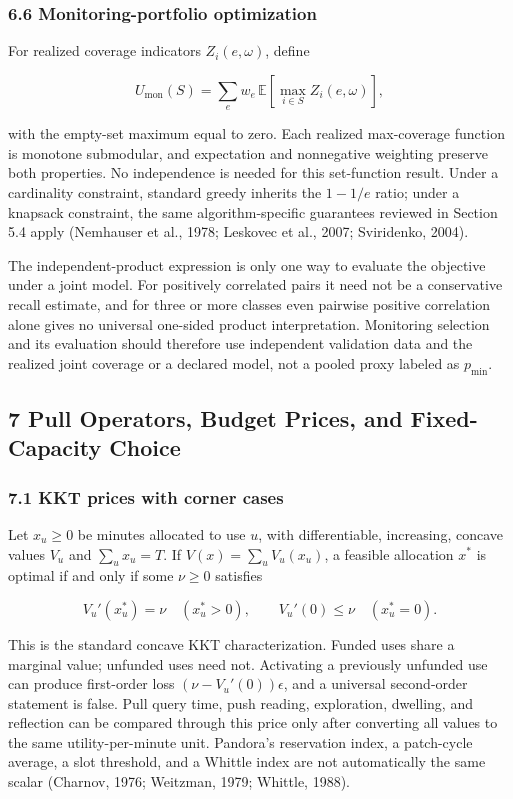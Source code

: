 \documentclass[
  11pt]{article}
\begin{document}
\subsubsection{6.6 Monitoring-portfolio
optimization}\label{monitoring-portfolio-optimization}

For realized coverage indicators \(Z_i(e,\omega)\), define

\[U_{\mathrm{mon}}(S)=\sum_e w_e\,\mathbb E\!\left[\max_{i\in S}Z_i(e,\omega)\right],\]

with the empty-set maximum equal to zero. Each realized max-coverage
function is monotone submodular, and expectation and nonnegative
weighting preserve both properties. No independence is needed for this
set-function result. Under a cardinality constraint, standard greedy
inherits the \(1-1/e\) ratio; under a knapsack constraint, the same
algorithm-specific guarantees reviewed in Section 5.4 apply (Nemhauser
et al., 1978; Leskovec et al., 2007; Sviridenko, 2004).

The independent-product expression is only one way to evaluate the
objective under a joint model. For positively correlated pairs it need
not be a conservative recall estimate, and for three or more classes
even pairwise positive correlation alone gives no universal one-sided
product interpretation. Monitoring selection and its evaluation should
therefore use independent validation data and the realized joint
coverage or a declared model, not a pooled proxy labeled as
\(p_{\min}\).

\subsection{7 Pull Operators, Budget Prices, and Fixed-Capacity
Choice}\label{pull-operators-budget-prices-and-fixed-capacity-choice}

\subsubsection{7.1 KKT prices with corner
cases}\label{kkt-prices-with-corner-cases}

Let \(x_u\ge0\) be minutes allocated to use \(u\), with differentiable,
increasing, concave values \(V_u\) and \(\sum_ux_u=T\). If
\(V(x)=\sum_uV_u(x_u)\), a feasible allocation \(x^*\) is optimal if and
only if some \(\nu\ge0\) satisfies

\[V_u'(x_u^*)=\nu\quad(x_u^*>0),\qquad V_u'(0)\le\nu\quad(x_u^*=0).\]

This is the standard concave KKT characterization. Funded uses share a
marginal value; unfunded uses need not. Activating a previously unfunded
use can produce first-order loss \((\nu-V_u'(0))\epsilon\), and a
universal second-order statement is false. Pull query time, push
reading, exploration, dwelling, and reflection can be compared through
this price only after converting all values to the same
utility-per-minute unit. Pandora's reservation index, a patch-cycle
average, a slot threshold, and a Whittle index are not automatically the
same scalar (Charnov, 1976; Weitzman, 1979; Whittle, 1988).
\end{document}
